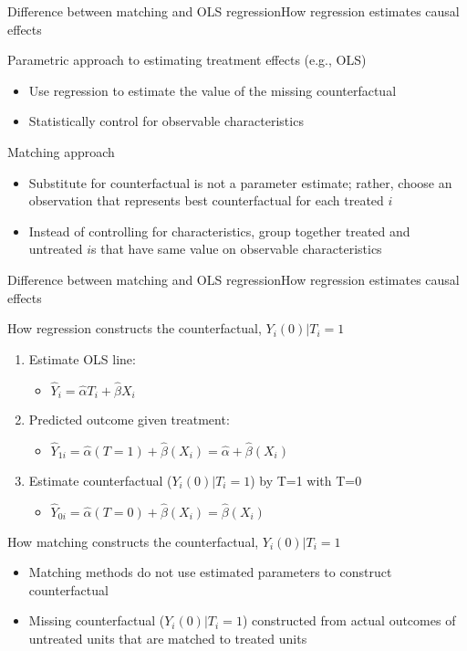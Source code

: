 \begin{frame}[shrink=10]{Difference between matching and OLS regression}{How regression estimates causal effects}

	Parametric approach to estimating treatment effects (e.g., OLS)
	\begin{itemize}
		\item Use regression to estimate the value of the missing counterfactual
		\item Statistically control for observable characteristics
	\end{itemize}
	\vspace{2mm}
	Matching approach
	\begin{itemize}
		\item Substitute for counterfactual is not a parameter estimate; rather, choose an observation that represents best counterfactual for each treated $i$
		\item Instead of controlling for characteristics, group together treated and untreated $i$s that have same value on observable characteristics 
	\end{itemize}
\end{frame}

\begin{frame}{Difference between matching and OLS regression}{How regression estimates causal effects}

	How regression constructs the counterfactual, $Y_i(0)|T_i=1$
	\begin{enumerate}
		\item Estimate OLS line:
		\begin{itemize}
			\item $\hat{Y}_i=\hat{\alpha} T_i+\hat{\beta} X_i$
		\end{itemize}
			\item Predicted outcome given treatment:
		\begin{itemize}
		\item $ \hat{Y}_{1i} = \hat{\alpha}(T=1)+ \hat{\beta}(X_i)= \hat{\alpha}+ \hat{\beta}(X_i)$
		\end{itemize}
		\item Estimate counterfactual ($Y_i(0)|T_i=1$) by T=1 with T=0
		\begin{itemize}
			\item $ \hat{Y}_{0i} = \hat{\alpha}(T=0)+ \hat{\beta}(X_i)= \hat{\beta}(X_i)$
		\end{itemize}
	\end{enumerate}
	\vspace{2mm}
	How matching constructs the counterfactual, $Y_i(0)|T_i=1$
	\begin{itemize}
		\item Matching methods do not use estimated parameters to construct counterfactual
		\item Missing counterfactual ($Y_i(0)|T_i=1$) constructed from actual outcomes of untreated units that are matched to treated units

	\end{itemize}
\end{frame}


